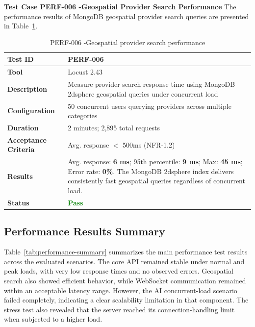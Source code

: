 \textbf{Test Case PERF-006 -Geospatial Provider Search Performance}
The performance results of MongoDB geospatial provider search queries are presented in Table~\ref{tab:perf006}.


\begin{table}[H]
\caption{PERF-006 -Geospatial provider search performance}
\centering
\begin{tabular}{|l|p{10cm}|}
\hline
\textbf{Test ID} & PERF-006 \\
\hline
\textbf{Tool} & Locust 2.43 \\
\hline
\textbf{Description} & Measure provider search response time using MongoDB 2dsphere geospatial queries under concurrent load \\
\hline
\textbf{Configuration} & 50 concurrent users querying providers across multiple categories \\
\hline
\textbf{Duration} & 2 minutes; 2,895 total requests \\
\hline
\textbf{Acceptance Criteria} & Avg. response $<$ 500ms (NFR-1.2) \\
\hline
\textbf{Results} & Avg. response: \textbf{6 ms}; 95th percentile: \textbf{9 ms}; Max: \textbf{45 ms}; Error rate: \textbf{0\%}. The MongoDB 2dsphere index delivers consistently fast geospatial queries regardless of concurrent load. \\
\hline
\textbf{Status} & \textcolor{green}{\textbf{Pass}} \\
\hline
\end{tabular}

\label{tab:perf006}
\end{table}

\subsection{Performance Results Summary}
Table~\ref{tab:performance-summary} summarizes the main performance test results across the evaluated scenarios. The core API remained stable under normal and peak loads, with very low response times and no observed errors. Geospatial search also showed efficient behavior, while WebSocket communication remained within an acceptable latency range. However, the AI concurrent-load scenario failed completely, indicating a clear scalability limitation in that component. The stress test also revealed that the server reached its connection-handling limit when subjected to a higher load.

